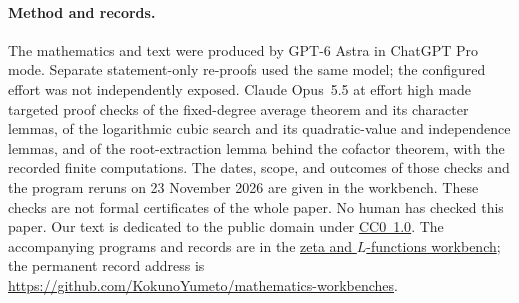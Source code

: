 \documentclass[11pt]{article}
\newcommand{\workbenchurl}{https://github.com/KokunoYumeto/zeta-and-l-functions-workbench}
\newcommand{\recordurl}{https://github.com/KokunoYumeto/mathematics-workbenches}
\theoremstyle{definition}
\theoremstyle{remark}
\begin{document}
\paragraph{Method and records.}
The mathematics and text were produced by GPT-6 Astra in ChatGPT Pro mode.
Separate statement-only re-proofs used the same model; the configured
effort was not independently exposed. Claude Opus~5.5 at effort high
made targeted proof checks of the fixed-degree average theorem and
its character lemmas, of the logarithmic cubic search and its
quadratic-value and independence lemmas, and of the root-extraction
lemma behind the cofactor theorem, with the recorded finite
computations. The dates, scope, and outcomes of those checks and the
program reruns on 23 November 2026 are given in the workbench.
These checks are not formal certificates of the whole paper.
No human has checked this paper.
Our text is dedicated to the public domain under
\href{https://creativecommons.org/publicdomain/zero/1.0/}{CC0~1.0}.
The accompanying programs and records are in the
\href{\workbenchurl}{zeta and $L$-functions workbench}; the permanent
record address is \url{\recordurl}.
\end{document}
